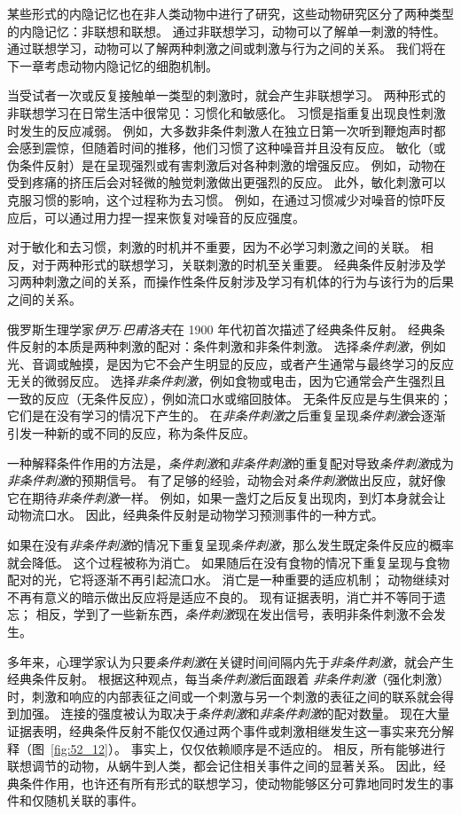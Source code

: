 某些形式的内隐记忆也在非人类动物中进行了研究，这些动物研究区分了两种类型的内隐记忆：非联想和联想。
通过非联想学习，动物可以了解单一刺激的特性。
通过联想学习，动物可以了解两种刺激之间或刺激与行为之间的关系。
我们将在下一章考虑动物内隐记忆的细胞机制。


当受试者一次或反复接触单一类型的刺激时，就会产生非联想学习。
两种形式的非联想学习在日常生活中很常见：习惯化和敏感化。
习惯是指重复出现良性刺激时发生的反应减弱。
例如，大多数非条件刺激人在独立日第一次听到鞭炮声时都会感到震惊，但随着时间的推移，他们习惯了这种噪音并且没有反应。
敏化（或伪条件反射）是在呈现强烈或有害刺激后对各种刺激的增强反应。
例如，动物在受到疼痛的挤压后会对轻微的触觉刺激做出更强烈的反应。
此外，敏化刺激可以克服习惯的影响，这个过程称为去习惯。
例如，在通过习惯减少对噪音的惊吓反应后，可以通过用力捏一捏来恢复对噪音的反应强度。


对于敏化和去习惯，刺激的时机并不重要，因为不必学习刺激之间的关联。
相反，对于两种形式的联想学习，关联刺激的时机至关重要。
经典条件反射涉及学习两种刺激之间的关系，而操作性条件反射涉及学习有机体的行为与该行为的后果之间的关系。


俄罗斯生理学家\textit{伊万$\cdot$巴甫洛夫}在 1900 年代初首次描述了经典条件反射。
经典条件反射的本质是两种刺激的配对：条件刺激和非条件刺激。
选择\textit{条件刺激}，例如光、音调或触摸，是因为它不会产生明显的反应，或者产生通常与最终学习的反应无关的微弱反应。
选择\textit{非条件刺激}，例如食物或电击，因为它通常会产生强烈且一致的反应（无条件反应），例如流口水或缩回肢体。
无条件反应是与生俱来的；
它们是在没有学习的情况下产生的。
在\textit{非条件刺激}之后重复呈现\textit{条件刺激}会逐渐引发一种新的或不同的反应，称为条件反应。


一种解释条件作用的方法是，\textit{条件刺激}和\textit{非条件刺激}的重复配对导致\textit{条件刺激}成为\textit{非条件刺激}的预期信号。
有了足够的经验，动物会对\textit{条件刺激}做出反应，就好像它在期待\textit{非条件刺激}一样。
例如，如果一盏灯之后反复出现肉，到灯本身就会让动物流口水。
因此，经典条件反射是动物学习预测事件的一种方式。


如果在没有\textit{非条件刺激}的情况下重复呈现\textit{条件刺激}，那么发生既定条件反应的概率就会降低。
这个过程被称为消亡。
如果随后在没有食物的情况下重复呈现与食物配对的光，它将逐渐不再引起流口水。
消亡是一种重要的适应机制；
动物继续对不再有意义的暗示做出反应将是适应不良的。
现有证据表明，消亡并不等同于遗忘；
相反，学到了一些新东西，\textit{条件刺激}现在发出信号，表明非条件刺激不会发生。


多年来，心理学家认为只要\textit{条件刺激}在关键时间间隔内先于\textit{非条件刺激}，就会产生经典条件反射。
根据这种观点，每当\textit{条件刺激}后面跟着 \textit{非条件刺激}（强化刺激）时，刺激和响应的内部表征之间或一个刺激与另一个刺激的表征之间的联系就会得到加强。
连接的强度被认为取决于\textit{条件刺激}和\textit{非条件刺激}的配对数量。
现在大量证据表明，经典条件反射不能仅仅通过两个事件或刺激相继发生这一事实来充分解释（图~\ref{fig:52_12}）。
事实上，仅仅依赖顺序是不适应的。
相反，所有能够进行联想调节的动物，从蜗牛到人类，都会记住相关事件之间的显著关系。
因此，经典条件作用，也许还有所有形式的联想学习，使动物能够区分可靠地同时发生的事件和仅随机关联的事件。


